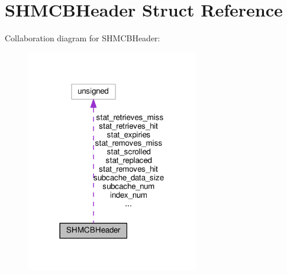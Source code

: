 \hypertarget{structSHMCBHeader}{}\section{S\+H\+M\+C\+B\+Header Struct Reference}
\label{structSHMCBHeader}


Collaboration diagram for S\+H\+M\+C\+B\+Header\+:
\nopagebreak
\begin{figure}[H]
\begin{center}
\leavevmode
\includegraphics[width=213pt]{structSHMCBHeader__coll__graph}
\end{center}
\end{figure}
